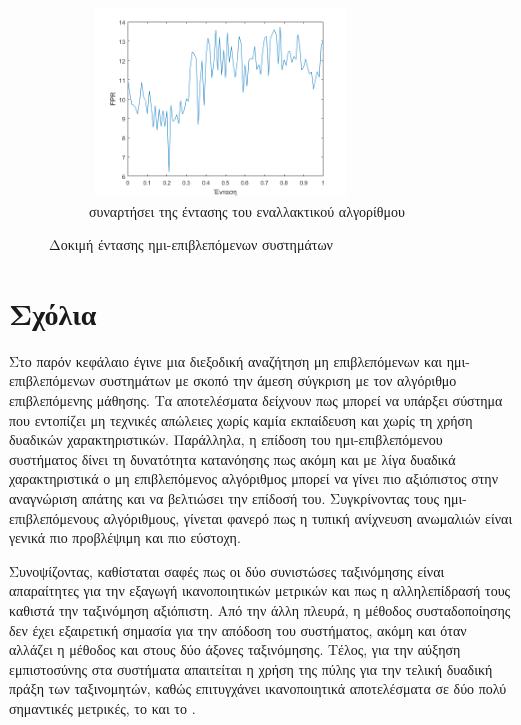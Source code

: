 \begin{figure}[ht!]
\begin{subfigure}[b]{0.4\textwidth}
\includegraphics[width=70mm, height=50mm]{../../plots/gr_fpr_intensity_semi_sup2.png}
\caption{ συναρτήσει της έντασης του εναλλακτικού αλγορίθμου}
\label{fig:testintfprsemisup2}
\end{subfigure}

\caption{Δοκιμή έντασης ημι-επιβλεπόμενων συστημάτων}
\label{fig:testintensitysemisup}
\end{figure}
\newpage
\section{Σχόλια}
Στο παρόν κεφάλαιο έγινε μια διεξοδική αναζήτηση μη επιβλεπόμενων και ημι-επιβλεπόμενων συστημάτων με σκοπό την άμεση σύγκριση με τον αλγόριθμο επιβλεπόμενης μάθησης. Τα αποτελέσματα δείχνουν πως μπορεί να υπάρξει σύστημα που εντοπίζει μη τεχνικές απώλειες χωρίς καμία εκπαίδευση και χωρίς τη χρήση δυαδικών χαρακτηριστικών. Παράλληλα, η επίδοση του ημι-επιβλεπόμενου συστήματος δίνει τη δυνατότητα κατανόησης πως ακόμη και με λίγα δυαδικά χαρακτηριστικά ο μη επιβλεπόμενος αλγόριθμος μπορεί να γίνει πιο αξιόπιστος στην αναγνώριση απάτης και να βελτιώσει την επίδοσή του. Συγκρίνοντας τους ημι-επιβλεπόμενους αλγόριθμους, γίνεται φανερό πως η τυπική ανίχνευση ανωμαλιών είναι γενικά πιο προβλέψιμη και πιο εύστοχη.\par
Συνοψίζοντας, καθίσταται σαφές πως οι δύο συνιστώσες ταξινόμησης είναι απαραίτητες για την εξαγωγή ικανοποιητικών μετρικών και πως η αλληλεπίδρασή τους καθιστά την ταξινόμηση αξιόπιστη. Από την άλλη πλευρά,  η μέθοδος συσταδοποίησης δεν έχει εξαιρετική σημασία για την απόδοση του συστήματος, ακόμη και όταν αλλάζει η μέθοδος και στους δύο άξονες ταξινόμησης. Τέλος, για την αύξηση εμπιστοσύνης στα συστήματα απαιτείται η χρήση της πύλης  για την τελική δυαδική πράξη των ταξινομητών, καθώς επιτυγχάνει ικανοποιητικά αποτελέσματα σε δύο πολύ σημαντικές μετρικές, το  και το .
